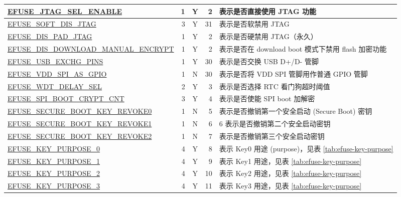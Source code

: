 \begin{longtable}[c]{ |m{8.2cm}|r|c|r|m{9.3cm}| }
    \hyperref[fielddesc:EFUSEJTAGSELENABLE]{EFUSE\_JTAG\_SEL\_ENABLE} & 1 & Y & 2 & 表示是否直接使用 JTAG 功能 \\   
    \hline
    \hyperref[fielddesc:EFUSESOFTDISJTAG]{EFUSE\_SOFT\_DIS\_JTAG} & 3 & Y & 31 & 表示是否软禁用 JTAG \\    
    \hline
    \hyperref[fielddesc:EFUSEDISPADJTAG]{EFUSE\_DIS\_PAD\_JTAG} & 1 & Y & 2 & 表示是否硬禁用 JTAG（永久） \\   
    \hline
    \hyperref[fielddesc:EFUSEDISDOWNLOADMANUALENCRYPT]{EFUSE\_DIS\_DOWNLOAD\_MANUAL\_ENCRYPT} &  1 & Y & 2 & 表示是否在 download boot 模式下禁用 flash 加密功能 \\ 
    \hline
    \hyperref[fielddesc:EFUSEUSBEXCHGPINS]{EFUSE\_USB\_EXCHG\_PINS} & 1 & Y & 30 & 表示是否交换 USB D+/D- 管脚 \\
    \hline
    \hyperref[fielddesc:EFUSEVDDSPIASGPIO]{EFUSE\_VDD\_SPI\_AS\_GPIO} & 1 & N & 30 & 表示是否将 VDD SPI 管脚用作普通 GPIO 管脚 \\
    \hline
    \hyperref[fielddesc:EFUSEWDTDELAYSEL]{EFUSE\_WDT\_DELAY\_SEL} & 2 & Y & 3 & 表示是否选择 RTC 看门狗超时阈值 \\
    \hline
    \hyperref[fielddesc:EFUSESPIBOOTCRYPTCNT]{EFUSE\_SPI\_BOOT\_CRYPT\_CNT} & 3 & Y & 4 & 表示是否使能 SPI boot 加解密 \\
    \hline
    \hyperref[fielddesc:EFUSESECUREBOOTKEYREVOKE0]{EFUSE\_SECURE\_BOOT\_KEY\_REVOKE0} & 1 & N & 5 & 表示是否撤销第一个安全启动 (Secure Boot) 密钥 \\
    \hline
    \hyperref[fielddesc:EFUSESECUREBOOTKEYREVOKE1]{EFUSE\_SECURE\_BOOT\_KEY\_REVOKE1} & 1 & N & 6 & 6 表示是否撤销第二个安全启动密钥 \\
    \hline
    \hyperref[fielddesc:EFUSESECUREBOOTKEYREVOKE2]{EFUSE\_SECURE\_BOOT\_KEY\_REVOKE2} & 1 & N & 7 & 表示是否撤销第三个安全启动密钥 \\
    \hline
    \hyperref[fielddesc:EFUSEKEYPURPOSE0]{EFUSE\_KEY\_PURPOSE\_0} & 4 & Y & 8 & 表示 Key0 用途 (purpose)，见表 \ref{tab:efuse-key-purpose} \\
    \hline
    \hyperref[fielddesc:EFUSEKEYPURPOSE1]{EFUSE\_KEY\_PURPOSE\_1} & 4 & Y & 9 & 表示 Key1 用途，见表 \ref{tab:efuse-key-purpose} \\
    \hline
    \hyperref[fielddesc:EFUSEKEYPURPOSE2]{EFUSE\_KEY\_PURPOSE\_2} & 4 & Y & 10 & 表示 Key2 用途，见表 \ref{tab:efuse-key-purpose} \\ 
    \hline
    \hyperref[fielddesc:EFUSEKEYPURPOSE3]{EFUSE\_KEY\_PURPOSE\_3} & 4 & Y & 11 & 表示 Key3 用途，见表 \ref{tab:efuse-key-purpose} \\    

\end{longtable}
